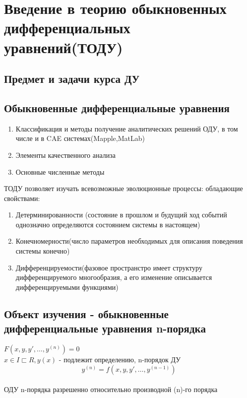 \documentclass[12pt]{article}
\begin{document}
  \tableofcontents
  \pagebreak
  \section{Введение в теорию обыкновенных дифференциальных уравнений(ТОДУ)}
  \subsection*{Предмет и задачи курса ДУ}
  \subsection*{Обыкновенные дифференциальные уравнения}
  \begin{enumerate}
    \item Классификация и методы получение аналитических решений ОДУ, в том числе и в CAE системах(Mapple,MatLab)
    \item Элементы качественного анализа
    \item Основные численные методы
  \end{enumerate}
  ТОДУ позволяет изучать всевозможные эволюционные процессы: обладающие свойствами:
  \begin{enumerate}
    \item Детерминированности (состояние в прошлом и будущий ход событий однозначно определяются
    состоянием системы в настоящем)
    \item Конечномерности(число параметров необходимых для описания поведения системы конечно)
    \item Дифференцируемости(фазовое пространстро имеет структуру дифференцируемого многообразия,
    а его изменение описывается дифференцируемыми функциями)
  \end{enumerate}
  \subsection*{Объект изучения - обыкновенные дифференциальные уравнения n-порядка}
  $F(x,y,y',\dots,y^{(n)})=0$\\
  $x \in I \sqsubset R,y(x)$ - подлежит определению, n-порядок ДУ\\
  \[y^{(n)}=f(x,y,y',\dots,y^{(n-1)})\] \\
  ОДУ n-порядка разрешенно относительно производной (n)-го порядка
\end{document}

